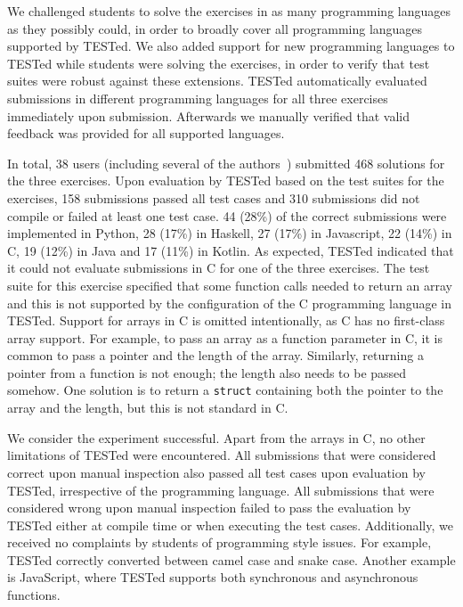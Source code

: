 \documentclass[../main]{subfiles}
\begin{document}
We challenged students to solve the exercises in as many programming languages as they possibly could, in order to broadly cover all programming languages supported by TESTed.
We also added support for new programming languages to TESTed while students were solving the exercises, in order to verify that test suites were robust against these extensions.
TESTed automatically evaluated submissions in different programming languages for all three exercises immediately upon submission.
Afterwards we manually verified that valid feedback was provided for all supported languages.

In total, 38 users (including several of the authors~\autocite{strijbolTESTedEducationalTesting2023}) submitted 468 solutions for the three exercises.
Upon evaluation by TESTed based on the test suites for the exercises, 158 submissions passed all test cases and 310 submissions did not compile or failed at least one test case.
44 (28\%) of the correct submissions were implemented in Python, 28 (17\%) in Haskell, 27 (17\%) in Javascript, 22 (14\%) in C, 19 (12\%) in Java and 17 (11\%) in Kotlin.
As expected, TESTed indicated that it could not evaluate submissions in C for one of the three exercises.
The test suite for this exercise specified that some function calls needed to return an array and this is not supported by the configuration of the C programming language in TESTed.
Support for arrays in C is omitted intentionally, as C has no first-class array support.
For example, to pass an array as a function parameter in C, it is common to pass a pointer and the length of the array.
Similarly, returning a pointer from a function is not enough;
the length also needs to be passed somehow.
One solution is to return a \texttt{struct} containing both the pointer to the array and the length, but this is not standard in C\@.

We consider the experiment successful.
Apart from the arrays in C, no other limitations of TESTed were encountered.
All submissions that were considered correct upon manual inspection also passed all test cases upon evaluation by TESTed, irrespective of the programming language.
All submissions that were considered wrong upon manual inspection failed to pass the evaluation by TESTed either at compile time or when executing the test cases.
Additionally, we received no complaints by students of programming style issues.
For example, TESTed correctly converted between camel case and snake case.
Another example is JavaScript, where TESTed supports both synchronous and asynchronous functions.
\end{document}
